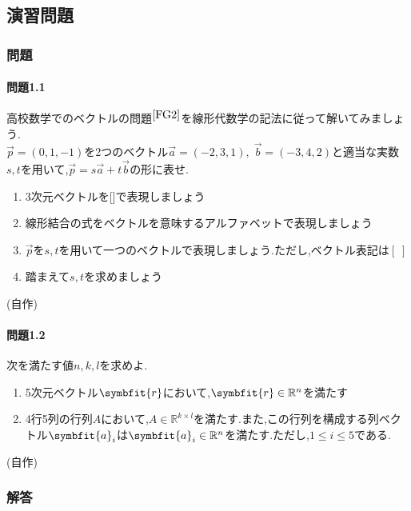 \subsection{演習問題}
\subsubsection*{問題}
\paragraph{問題1.1}
高校数学でのベクトルの問題$^{\cite{FG2}}$を線形代数学の記法に従って解いてみましょう.\\$\vec{p}=(0,1,-1)$を2つのベクトル$\vec{a}=(-2,3,1),\;\vec{b}=(-3,4,2)$と適当な実数$s,t$を用いて,\;$\vec{p}=s\vec{a}+t\vec{b}$の形に表せ.
\begin{enumerate}[label=(\arabic*)]
    \item 3次元ベクトルを[\;]で表現しましょう
    \item 線形結合の式をベクトルを意味するアルファベットで表現しましょう
    \item $\vec{p}$を$s,t$を用いて一つのベクトルで表現しましょう.ただし,ベクトル表記は$[\;]$
    \item 踏まえて$s,t$を求めましょう
\end{enumerate}
\begin{flushright} (自作) \end{flushright}
\paragraph{問題1.2}
次を満たす値$n,k,l$を求めよ.
\begin{enumerate}[label=(\arabic*)]
    \item 5次元ベクトル$\symbfit{r}$において,$\symbfit{r}\in \mathbb{R}^n$を満たす
    \item 4行5列の行列$A$において,$A\in\mathbb{R}^{k\times l}$を満たす.また,この行列を構成する列ベクトル$\symbfit{a}_i$は$\symbfit{a}_i\in \mathbb{R}^n$を満たす.ただし,$1\leq i \leq 5$である.
\end{enumerate}
\begin{flushright} (自作) \end{flushright}
\subsubsection*{解答}
